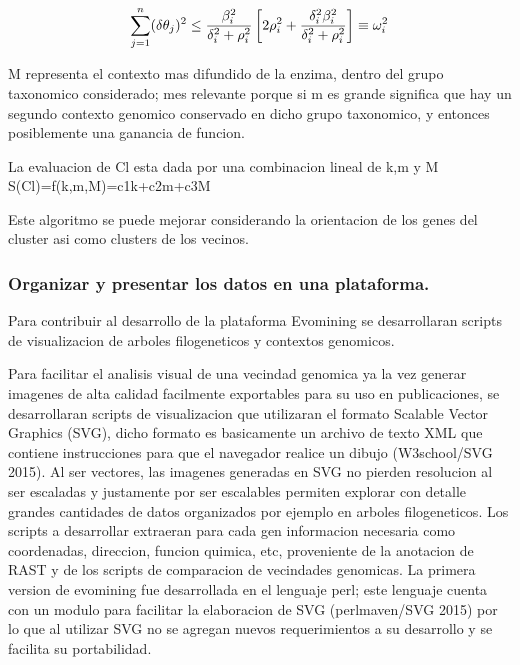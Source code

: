 \documentclass[12pt,twoside]{reedthesis}
\begin{document}
  \[\sum_{j=1}^n (\delta\theta_j)^2 \leq {{\beta_i^2}\over{\delta_i^2 + \rho_i^2}}
  \left[ 2\rho_i^2 + {\delta_i^2\beta_i^2\over{\delta_i^2 + \rho_i^2}} \right] \equiv \omega_i^2
  \]
  
  M representa el contexto mas difundido de la enzima, dentro del grupo
  taxonomico considerado; mes relevante porque si m es grande significa
  que hay un segundo contexto genomico conservado en dicho grupo
  taxonomico, y entonces posiblemente una ganancia de funcion.
  
  La evaluacion de Cl esta dada por una combinacion lineal de k,m y M\\
  S(Cl)=f(k,m,M)=c1k+c2m+c3M
  
  Este algoritmo se puede mejorar considerando la orientacion de los genes
  del cluster asi como clusters de los vecinos.
  
  \subsubsection{Organizar y presentar los datos en una
  plataforma.}\label{organizar-y-presentar-los-datos-en-una-plataforma.}
  
  Para contribuir al desarrollo de la plataforma Evomining se
  desarrollaran scripts de visualizacion de arboles filogeneticos y
  contextos genomicos.
  
  Para facilitar el analisis visual de una vecindad genomica ya la vez
  generar imagenes de alta calidad facilmente exportables para su uso en
  publicaciones, se desarrollaran scripts de visualizacion que utilizaran
  el formato Scalable Vector Graphics (SVG), dicho formato es basicamente
  un archivo de texto XML que contiene instrucciones para que el navegador
  realice un dibujo (W3school/SVG 2015). Al ser vectores, las imagenes
  generadas en SVG no pierden resolucion al ser escaladas y justamente por
  ser escalables permiten explorar con detalle grandes cantidades de datos
  organizados por ejemplo en arboles filogeneticos. Los scripts a
  desarrollar extraeran para cada gen informacion necesaria como
  coordenadas, direccion, funcion quimica, etc, proveniente de la
  anotacion de RAST y de los scripts de comparacion de vecindades
  genomicas. La primera version de evomining fue desarrollada en el
  lenguaje perl; este lenguaje cuenta con un modulo para facilitar la
  elaboracion de SVG (perlmaven/SVG 2015) por lo que al utilizar SVG no se
  agregan nuevos requerimientos a su desarrollo y se facilita su
  portabilidad.
  
\end{document}
